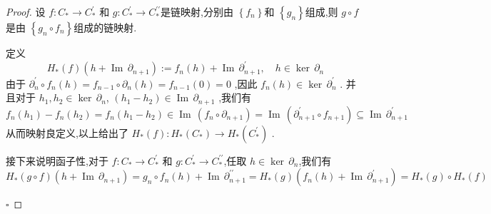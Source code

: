 \documentclass[../../几何与拓扑.tex]{subfiles}
\begin{document}
\begin{proof}

    设 \(  f: C_{*}\to C_{*}^{\prime}   \) 和 \(  g: C_{*}^{\prime} \to  C_{*}^{\prime \prime}   \)是链映射,分别由 \(  \left\{ f_{n} \right\}  \)和 \(  \left\{ g_{n} \right\}  \)组成,则 \(g\circ f \)是由 \(  \left\{g_{n}\circ f_{n} \right\}  \)组成的链映射.
    

    定义 \[
    H_{*}\left( f \right) \left( h+  \operatorname{Im}\,\partial _{n+ 1} \right) :=    f_{n}\left( h \right) +  \operatorname{Im}\,\partial _{n+ 1}^{\prime} ,\quad  h \in  \operatorname{ker}\,\partial _{n}
    \]由于 \(  \partial _{n}^{\prime} \circ f _{n} \left( h \right) =   f_{n-1}\circ \partial _{n} \left( h \right) =  f_{n-1}\left( 0 \right)= 0     \) ,因此 \(  f_{n}\left( h \right) \in  \operatorname{ker}\,\partial _{n}^{\prime}    \) .
    并且对于 \(  h_1,h_2 \in \operatorname{ker}\,\partial _{n}  \), \(  \left( h_1-h_2 \right) \in \operatorname{Im}\,\partial _{n+ 1}   \)   ,我们有 \(  f_{n}\left( h_1 \right)-f_{n}\left( h_2 \right)= f_{n}\left( h_1-h_2 \right) \in \operatorname{Im}\,\left( f_{n}\circ \partial _{n+ 1} \right) = \operatorname{Im}\, \left( \partial _{n+ 1}^{\prime} \circ f_{n+ 1} \right)\subseteq \operatorname{Im}\,\partial _{n+ 1}^{\prime}       \) 
    从而映射良定义,以上给出了 \(  H_{*}\left( f \right): H_{*}\left( C_{*} \right)\to H_{*}\left( C_{*}^{\prime}  \right)     \) .

    接下来说明函子性,对于 \(  f: C_{*}\to C_{*}^{\prime}   \) 和 \(  g: C_{*}^{\prime} \to C_{*}^{\prime \prime}   \),任取 \(  h  \in \operatorname{ker}\,\partial _{n}  \),我们有 \[
    H_{*}\left( g\circ f\right)\left( h+ \operatorname{Im}\,\partial _{n+ 1} \right) =  g_{n}\circ f_{n}\left( h \right)+  \operatorname{Im}\,\partial _{n+ 1}^{\prime \prime}  = H_{*}\left( g \right)\left( f_{n}\left(h  \right) + \operatorname{Im}\,\partial _{n+ 1}^{\prime}  \right)   = H_{*}\left( g \right)\circ H_{*}\left( f \right)  
    \]  

    \hfill $\square$
\end{proof}
\end{document}
